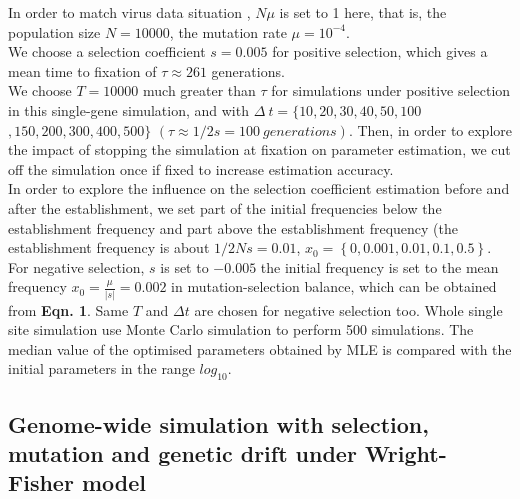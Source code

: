 \documentclass[12pt]{article}
\begin{document}
In order to match virus data situation \citep{seo2002estimation, sanjuan2010viral}, $N\mu$ is set to 1 here, that is, the population size $N=10000$, the mutation rate $\mu=10^{-4}$.\\

We choose a selection coefficient $s=0.005$ for positive selection, which gives a mean time to fixation of $\tau\approx261$ generations. \\

We choose $T=10000$ much greater than $\tau$ for simulations under positive selection in this single-gene simulation, and with $\Delta\ t=\{10,20,30,40,50,100$ $,150,200,300,400,500\}$ $(\tau\approx1/2s=100\ generations)$. Then, in order to explore the impact of stopping the simulation at fixation on parameter estimation, we cut off the simulation once if fixed to increase estimation accuracy.\\

In order to explore the influence on the selection coefficient estimation before and after the establishment, we set part of the initial frequencies below the establishment frequency and part above the establishment frequency (the establishment frequency is about $1/2Ns=0.01$, $x_0=\left\{0, 0.001, 0.01, 0.1, 0.5\right\}$.\\

For negative selection, $s$ is set to $-0.005$ the initial frequency is set to the mean frequency $x_0=\frac{\mu}{|s|}=0.002$ in mutation-selection balance, which can be obtained from \textbf{Eqn. 1}. Same $T$ and $\Delta t$ are chosen for negative selection too. Whole single site simulation use Monte Carlo simulation to perform 500 simulations. The median value of the optimised parameters obtained by MLE is compared with the initial parameters in the range $log_{10}$.\\


\subsection{Genome-wide simulation with selection, mutation and genetic drift under Wright-Fisher model}  
\end{document}
